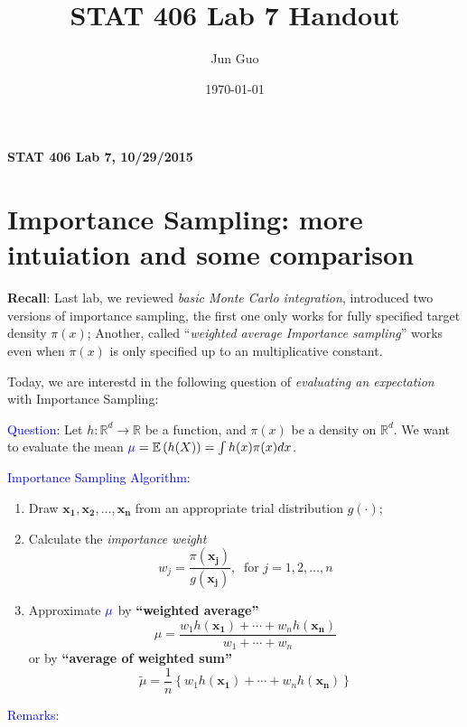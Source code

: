 \documentclass[12pt]{article}
\title{\textbf{STAT 406 Lab 7 Handout}}
\author{Jun Guo}
\date{\today}
\newcommand{\E}{\mathbb{E}}
\newcommand{\R}{\mathbb{R}}
\newcommand{\set}[1]{\left\{#1\right\}}
\newcommand{\paren}[1]{\left(#1\right)}
\numberwithin{equation}{subsection}
\begin{document}
\begin{center}
\large
\textbf{STAT 406 Lab 7, 10/29/2015}
\end{center}\vspace*{5mm}

\section{Importance Sampling: more intuiation and some comparison}

\textbf{Recall}: Last lab, we reviewed \textit{basic Monte Carlo integration}, introduced two versions of importance sampling, the first one only works for fully specified target density $\pi(x)$; Another, called ``\textit{weighted average Importance sampling}'' works even when $\pi(x)$ is only specified up to an multiplicative constant.  \newline

Today, we are interestd in the following question of \textit{evaluating an expectation} with Importance Sampling:\newline

\noindent
\textcolor{blue}{Question}: Let $h : \R^{d} \to \R$ be a function, and $\pi(x)$ be a density on $\R^{d}$. We want to evaluate the mean $\textcolor{blue}{\mu} = \E\paren{h(X)} = \int h(x)\pi(x) dx$. \newline

\noindent
\textcolor{blue}{Importance Sampling Algorithm}:
\begin{enumerate}[(1)]
\item Draw $\mathbf{x_1}, \mathbf{x_2}, \dots, \mathbf{x_n}$ from an appropriate trial distribution $g(\cdot)$;
\item Calculate the \textit{importance weight} $$w_j = \frac{\pi(\mathbf{x_j})}{g(\mathbf{x_j})},~\text{ for } j = 1, 2, \dots, n$$
\item Approximate $\textcolor{blue}{\mu}$ by \textbf{``weighted average''}
\begin{equation}\label{eq:eqv1}
\hat{\mu} = \frac{w_1h(\mathbf{x_1}) + \cdots + w_nh(\mathbf{x_n})}{w_1 + \cdots + w_n}
\end{equation}
or by \textbf{``average of weighted sum''}
\begin{equation}\label{eq:eqv2}
\tilde{\mu} = \frac{1}{n}\set{w_1h(\mathbf{x_1}) + \cdots + w_nh(\mathbf{x_n})}
\end{equation}
\end{enumerate}

\noindent
\textcolor{blue}{Remarks}:
\end{document}
